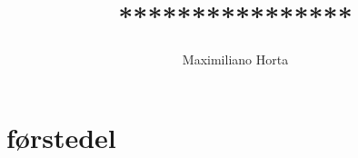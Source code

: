 \documentclass[12pt,a4paper,norsk]{article}
\begin{document}
\title{****************}
\author{Maximiliano Horta}

\maketitle

\newpage

\section*{førstedel}


\end{document}
